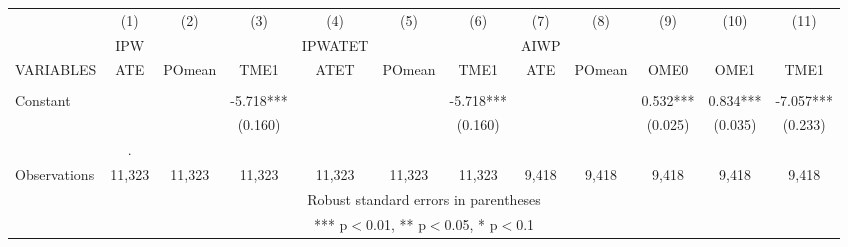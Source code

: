 \documentclass[]{article}
\begin{document}
\centering
\tiny
\begin{tabular}{lccccccccccc} \hline
 & (1) & (2) & (3) & (4) & (5) & (6) & (7) & (8) & (9) & (10) & (11) \\
 & IPW &  &  & IPWATET &  &  & AIWP &  &  &  &  \\
VARIABLES & ATE & POmean & TME1 & ATET & POmean & TME1 & ATE & POmean & OME0 & OME1 & TME1 \\ \hline
 &  &  &  &  &  &  &  &  &  &  &  \\
Constant &  &  & -5.718*** &  &  & -5.718*** &  &  & 0.532*** & 0.834*** & -7.057*** \\
 &  &  & (0.160) &  &  & (0.160) &  &  & (0.025) & (0.035) & (0.233) \\
 & . &  &  &  &  &  &  &  &  &  &  \\
 Observations & 11,323 & 11,323 & 11,323 & 11,323 & 11,323 & 11,323 & 9,418 & 9,418 & 9,418 & 9,418 & 9,418 \\ \hline
\multicolumn{12}{c}{ Robust standard errors in parentheses} \\
\multicolumn{12}{c}{ *** p$<$0.01, ** p$<$0.05, * p$<$0.1} \\
\end{tabular}
\end{document}
